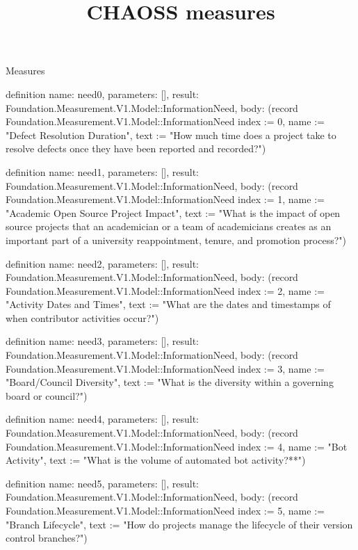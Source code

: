 \begin{lexlean}{Measures}
\title{CHAOSS measures}
\begin{semanticmodule}
definition{
  name: need0,
  parameters: [],
  result: Foundation.Measurement.V1.Model::InformationNeed,
  body: (record Foundation.Measurement.V1.Model::InformationNeed {index := 0, name := "Defect Resolution Duration", text := "How much time does a project take to resolve defects once they have been reported and recorded?"})
}

definition{
  name: need1,
  parameters: [],
  result: Foundation.Measurement.V1.Model::InformationNeed,
  body: (record Foundation.Measurement.V1.Model::InformationNeed {index := 1, name := "Academic Open Source Project Impact", text := "What is the impact of open source projects that an academician or a team of academicians creates as an important part of a university reappointment, tenure, and promotion process?"})
}

definition{
  name: need2,
  parameters: [],
  result: Foundation.Measurement.V1.Model::InformationNeed,
  body: (record Foundation.Measurement.V1.Model::InformationNeed {index := 2, name := "Activity Dates and Times", text := "What are the dates and timestamps of when contributor activities occur?"})
}

definition{
  name: need3,
  parameters: [],
  result: Foundation.Measurement.V1.Model::InformationNeed,
  body: (record Foundation.Measurement.V1.Model::InformationNeed {index := 3, name := "Board/Council Diversity", text := "What is the diversity within a governing board or council?"})
}

definition{
  name: need4,
  parameters: [],
  result: Foundation.Measurement.V1.Model::InformationNeed,
  body: (record Foundation.Measurement.V1.Model::InformationNeed {index := 4, name := "Bot Activity", text := "What is the volume of automated bot activity?**"})
}

definition{
  name: need5,
  parameters: [],
  result: Foundation.Measurement.V1.Model::InformationNeed,
  body: (record Foundation.Measurement.V1.Model::InformationNeed {index := 5, name := "Branch Lifecycle", text := "How do projects manage the lifecycle of their version control branches?"})
}


\end{semanticmodule}
\end{lexlean}
